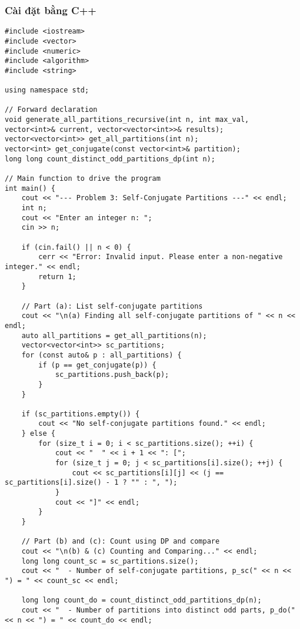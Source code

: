\documentclass[a4paper,12pt]{article}
\begin{document}
\subsubsection{Cài đặt bằng C++}
\begin{lstlisting}[style=cppstyle, caption={Self-conjugate and Distinct-Odd Partitions in C++.}, label={lst:cpp_self_conj}]
#include <iostream>
#include <vector>
#include <numeric>
#include <algorithm>
#include <string>

using namespace std;

// Forward declaration
void generate_all_partitions_recursive(int n, int max_val, vector<int>& current, vector<vector<int>>& results);
vector<vector<int>> get_all_partitions(int n);
vector<int> get_conjugate(const vector<int>& partition);
long long count_distinct_odd_partitions_dp(int n);

// Main function to drive the program
int main() {
    cout << "--- Problem 3: Self-Conjugate Partitions ---" << endl;
    int n;
    cout << "Enter an integer n: ";
    cin >> n;

    if (cin.fail() || n < 0) {
        cerr << "Error: Invalid input. Please enter a non-negative integer." << endl;
        return 1;
    }

    // Part (a): List self-conjugate partitions
    cout << "\n(a) Finding all self-conjugate partitions of " << n << endl;
    auto all_partitions = get_all_partitions(n);
    vector<vector<int>> sc_partitions;
    for (const auto& p : all_partitions) {
        if (p == get_conjugate(p)) {
            sc_partitions.push_back(p);
        }
    }

    if (sc_partitions.empty()) {
        cout << "No self-conjugate partitions found." << endl;
    } else {
        for (size_t i = 0; i < sc_partitions.size(); ++i) {
            cout << "  " << i + 1 << ": [";
            for (size_t j = 0; j < sc_partitions[i].size(); ++j) {
                cout << sc_partitions[i][j] << (j == sc_partitions[i].size() - 1 ? "" : ", ");
            }
            cout << "]" << endl;
        }
    }

    // Part (b) and (c): Count using DP and compare
    cout << "\n(b) & (c) Counting and Comparing..." << endl;
    long long count_sc = sc_partitions.size();
    cout << "  - Number of self-conjugate partitions, p_sc(" << n << ") = " << count_sc << endl;

    long long count_do = count_distinct_odd_partitions_dp(n);
    cout << "  - Number of partitions into distinct odd parts, p_do(" << n << ") = " << count_do << endl;


\end{lstlisting}
\end{document}

